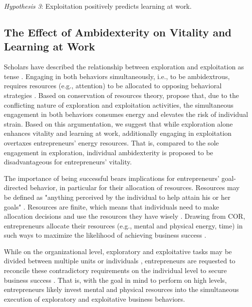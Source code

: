 \documentclass[man]{apa7}
\begin{document}
\textit{Hypothesis 3}: Exploitation positively predicts learning at work.

\subsection{The Effect of Ambidexterity on Vitality and Learning at Work}

Scholars have described the relationship between exploration and exploitation as tense \parencite[e.g.,][]{Li2008, Andriopoulos2009}. 
Engaging in both behaviors simultaneously, i.e., to be ambidextrous, requires resources (e.g., attention) to be allocated to opposing behavioral strategies \parencite{Laureiro-Martinez2010}. 
Based on conservation of resources \parencite[COR;][]{Hobfoll.1989} theory, \textcite{Hunter2017} propose that, due to the conflicting nature of exploration and exploitation activities, the simultaneous engagement in both behaviors consumes energy and elevates the risk of individual strain.
Based on this argumentation, we suggest that while exploration alone enhances vitality and learning at work, additionally engaging in exploitation overtaxes entrepreneurs' energy resources. 
That is, compared to the sole engagement in exploration, individual ambidexterity is proposed to be disadvantageous for entrepreneurs' vitality. \par

The importance of being successful bears implications for entrepreneurs' goal-directed behavior, in particular for their allocation of resources. 
Resources may be defined as "anything perceived by the individual to help attain his or her goals" \parencite[p.5]{Halbesleben2014}. 
Resources are finite, which means that individuals need to make allocation decisions and use the resources they have wisely \parencite{Halbesleben2014}.
Drawing from COR, entrepreneurs allocate their resources (e.g., mental and physical energy, time) in such ways to maximize the likelihood of achieving business success \parencite[e.g.,][]{Hobfoll.2001}. \par 

While on the organizational level, exploratory and exploitative tasks may be divided between multiple units or individuals \parencite{March.1991}, entrepreneurs are requested to reconcile these contradictory requirements on the individual level to secure business success \parencite[e.g.,][]{Rosing.2017}. 
That is, with the goal in mind to perform on high levels, entrepreneurs likely invest mental and physical resources into the simultaneous execution of exploratory and exploitative business behaviors. \par 
\end{document}
